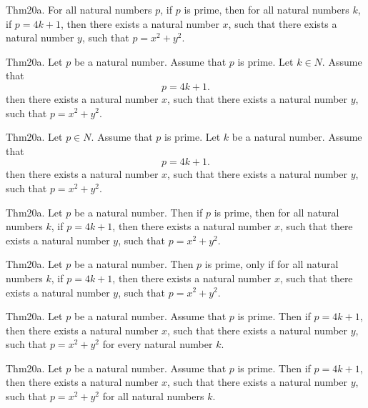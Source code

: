 \documentclass{article}
\begin{document}
Thm20a. For all natural numbers $p$, if $p$ is prime, then for all natural numbers $k$, if $p = 4 k + 1$, then there exists a natural number $x$, such that there exists a natural number $y$, such that $p = x ^{ 2}+ y ^{ 2}$.

Thm20a. Let $p$ be a natural number. Assume that $p$ is prime. Let $k \in N$. Assume that $$p = 4 k + 1.$$ then there exists a natural number $x$, such that there exists a natural number $y$, such that $p = x ^{ 2}+ y ^{ 2}$.

Thm20a. Let $p \in N$. Assume that $p$ is prime. Let $k$ be a natural number. Assume that $$p = 4 k + 1.$$ then there exists a natural number $x$, such that there exists a natural number $y$, such that $p = x ^{ 2}+ y ^{ 2}$.

Thm20a. Let $p$ be a natural number. Then if $p$ is prime, then for all natural numbers $k$, if $p = 4 k + 1$, then there exists a natural number $x$, such that there exists a natural number $y$, such that $p = x ^{ 2}+ y ^{ 2}$.

Thm20a. Let $p$ be a natural number. Then $p$ is prime, only if for all natural numbers $k$, if $p = 4 k + 1$, then there exists a natural number $x$, such that there exists a natural number $y$, such that $p = x ^{ 2}+ y ^{ 2}$.

Thm20a. Let $p$ be a natural number. Assume that $p$ is prime. Then if $p = 4 k + 1$, then there exists a natural number $x$, such that there exists a natural number $y$, such that $p = x ^{ 2}+ y ^{ 2}$ for every natural number $k$.

Thm20a. Let $p$ be a natural number. Assume that $p$ is prime. Then if $p = 4 k + 1$, then there exists a natural number $x$, such that there exists a natural number $y$, such that $p = x ^{ 2}+ y ^{ 2}$ for all natural numbers $k$.
\end{document}
